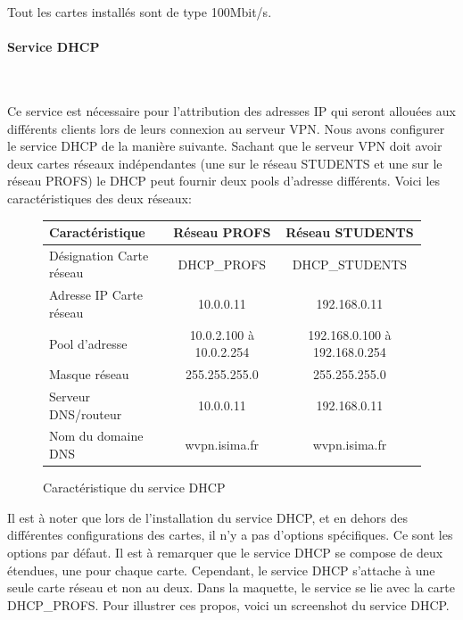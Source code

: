 Tout les cartes installés sont de type 100Mbit/s.
~

\paragraph{Service DHCP}
~\


Ce service est nécessaire pour l'attribution des adresses IP qui seront allouées aux différents clients lors de leurs connexion au serveur VPN. Nous avons configurer le service DHCP de la manière suivante. Sachant que le serveur VPN doit avoir deux cartes réseaux indépendantes (une sur le réseau STUDENTS et une sur le réseau PROFS) le DHCP peut fournir deux pools d'adresse différents. 
Voici les caractéristiques des deux réseaux:

\begin{figure}[H]
	\begin{center}
\begin{tabular}{|l|c|c|}
\hline
Caractéristique & Réseau PROFS & Réseau STUDENTS \\
\hline
Désignation Carte réseau & DHCP\_PROFS & DHCP\_STUDENTS \\
Adresse IP Carte réseau & 10.0.0.11 & 192.168.0.11 \\
Pool d'adresse & 10.0.2.100 à 10.0.2.254 & 192.168.0.100 à 192.168.0.254 \\
Masque réseau & 255.255.255.0 & 255.255.255.0 \\
Serveur DNS/routeur & 10.0.0.11 & 192.168.0.11 \\
Nom du domaine DNS & wvpn.isima.fr & wvpn.isima.fr \\
\hline
\end{tabular}
	\end{center}
	\caption{Caractéristique du service DHCP}
	\label{service_DHCP}
\end{figure}

Il est à noter que lors de l'installation du service DHCP, et en dehors des différentes configurations des cartes, il n'y a pas d'options spécifiques. Ce sont les options par défaut.
Il est à remarquer que le service DHCP se compose de deux étendues, une pour chaque carte. Cependant, le service DHCP s'attache à une seule carte réseau et non au deux. Dans la maquette, le service se lie avec la carte DHCP\_PROFS. Pour illustrer ces propos, voici un screenshot du service DHCP.

